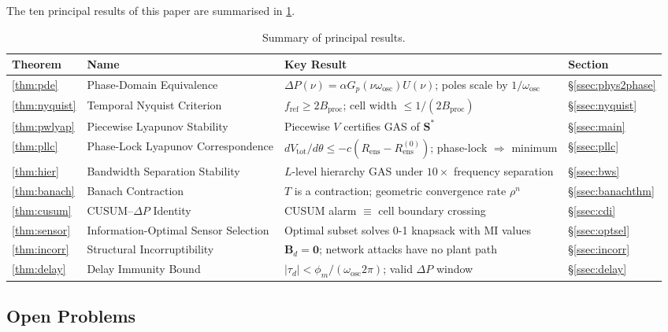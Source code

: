 \documentclass[10pt,twocolumn]{article}
\theoremstyle{plain}
\theoremstyle{definition}
\theoremstyle{remark}
\newcommand{\DeltaP}{\Delta P}
\newcommand{\omegaosc}{\omega_{\mathrm{osc}}}
\newcommand{\Sstar}{\mathbf{S}^{*}}
\newcommand{\Rens}{R_{\mathrm{ens}}}
\newcommand{\fref}{f_{\mathrm{ref}}}
\newcommand{\Bproc}{B_{\mathrm{proc}}}
\begin{document}
The ten principal results of this paper are summarised in
\cref{tab:theorems}.

\begin{table}[t]
\centering
\caption{Summary of principal results.}
\label{tab:theorems}
\begin{tabular}{@{}llll@{}}
\toprule
\textbf{Theorem} & \textbf{Name} & \textbf{Key Result} & \textbf{Section}\\
\midrule
\ref{thm:pde} & Phase-Domain Equivalence
  & $\DeltaP(\nu)=\alpha G_p(\nu\omegaosc)U(\nu)$; poles scale by $1/\omegaosc$
  & \S\ref{ssec:phys2phase}\\[2pt]
\ref{thm:nyquist} & Temporal Nyquist Criterion
  & $\fref \geq 2\Bproc$; cell width $\leq 1/(2\Bproc)$
  & \S\ref{ssec:nyquist}\\[2pt]
\ref{thm:pwlyap} & Piecewise Lyapunov Stability
  & Piecewise $V$ certifies GAS of $\Sstar$
  & \S\ref{ssec:main}\\[2pt]
\ref{thm:pllc} & Phase-Lock Lyapunov Correspondence
  & $dV_{\mathrm{tot}}/d\theta \leq -c(\Rens-\Rens^{(0)})$; phase-lock $\Rightarrow$ minimum
  & \S\ref{ssec:pllc}\\[2pt]
\ref{thm:hier} & Bandwidth Separation Stability
  & $L$-level hierarchy GAS under $10\times$ frequency separation
  & \S\ref{ssec:bws}\\[2pt]
\ref{thm:banach} & Banach Contraction
  & $T$ is a contraction; geometric convergence rate $\rho^n$
  & \S\ref{ssec:banachthm}\\[2pt]
\ref{thm:cusum} & CUSUM--$\DeltaP$ Identity
  & CUSUM alarm $\equiv$ cell boundary crossing
  & \S\ref{ssec:cdi}\\[2pt]
\ref{thm:sensor} & Information-Optimal Sensor Selection
  & Optimal subset solves 0-1 knapsack with MI values
  & \S\ref{ssec:optsel}\\[2pt]
\ref{thm:incorr} & Structural Incorruptibility
  & $\mathbf{B}_d=\mathbf{0}$; network attacks have no plant path
  & \S\ref{ssec:incorr}\\[2pt]
\ref{thm:delay} & Delay Immunity Bound
  & $|\tau_d| < \phi_m/(\omegaosc 2\pi)$; valid $\DeltaP$ window
  & \S\ref{ssec:delay}\\[2pt]
\bottomrule
\end{tabular}
\end{table}

\subsection{Open Problems}
\end{document}
